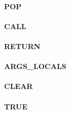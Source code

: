 \documentclass[12pt,a4paper]{article}
\begin{document}
\vspace{2em}\begin{minipage}{\textwidth}
\paragraph{POP}
\end{minipage}

\vspace{2em}\begin{minipage}{\textwidth}
\paragraph{CALL}
\end{minipage}

\vspace{2em}\begin{minipage}{\textwidth}
\paragraph{RETURN}
\end{minipage}

\vspace{2em}\begin{minipage}{\textwidth}
\paragraph{ARGS\_LOCALS}
\end{minipage}

\vspace{2em}\begin{minipage}{\textwidth}
\paragraph{CLEAR}
\end{minipage}

\vspace{2em}\begin{minipage}{\textwidth}
\paragraph{TRUE}
\end{minipage}
\end{document}
